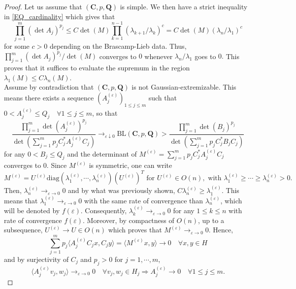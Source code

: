 \documentclass[11pt,a4paper,reqno]{amsart}
\numberwithin{equation}{section}
\theoremstyle{definition}
\newcommand{\<}{\ensuremath \leq}
\renewcommand{\>}{\ensuremath \geq}
\renewcommand{\epsilon}{\varepsilon}
\begin{document}
\begin{proof}
    
    Let us assume that $(\textbf{C},p,\textbf{Q})$ is simple. We then have a strict inequality in \cref{EQ_cardinality} which gives that $$\prod_{j=1}^m (\det A_j)^{p_j} \leq C \det(M) \prod_{k=1}^{n-1}(\lambda_{k+1}/\lambda_k)^c=C \det(M) (\lambda_n /\lambda_1)^c$$ for some $c>0$ depending on the Brascamp-Lieb data. Thus, $\prod_{j=1}^m (\det A_j)^{p_j}/\det(M)$ converges to $0$ whenever $\lambda_n/\lambda_1$ goes to $0.$ This proves that it suffices to evaluate the supremum in the region $\lambda_1(M) \leq C\lambda_n(M).$ \\ Assume by contradiction that $(\textbf{C},p,\textbf{Q})$ is not Gaussian-extremizable. This means there exists a sequence $(A_j^{(\epsilon)})_{1 \leq j \leq m}$ such that $0<A_j^{(\epsilon)} \leq Q_j \quad \forall 1 \leq j \leq m$, so that $$\frac{\prod_{j=1}^m \det(A_j^{(\epsilon)})^{p_j}}{\det(\sum_{j=1}^m p_jC_j^*A_j^{(\epsilon)}C_j)} \rightarrow_{\epsilon \downarrow 0} \mathrm{BL}(\textbf{C},p,\textbf{Q})>\frac{\prod_{j=1}^m \det(B_j)^{p_j}}{\det(\sum_{j=1}^m p_jC_j^*B_jC_j)}$$ for any $0<B_j \leq Q_j$ and the determinant of $M^{(\epsilon)}=\sum_{j=1}^m p_jC_j^* A_j^{(\epsilon)}C_j$  converges to $0.$ Since $M^{(\epsilon)}$ is symmetric, one can write $$M^{(\epsilon)}=U^{(\epsilon)}\mathrm{diag}(\lambda_1^{(\epsilon)},\cdots,\lambda_n^{(\epsilon)})(U^{(\epsilon)})^T \text{ for } U^{(\epsilon)} \in O(n), \text{ with } \lambda_1^{(\epsilon)} \geq \cdots \geq \lambda_n^{(\epsilon)}>0.$$ Then, $\lambda_n^{(\epsilon)} \rightarrow_{\epsilon \rightarrow 0} 0$ and by what was previously shown, $C\lambda_n^{(\epsilon)} \geq \lambda_1^{(\epsilon)}$. This means that $\lambda_1^{(\epsilon)} \rightarrow_{\epsilon \rightarrow 0} 0$ with the same rate of convergence than $\lambda_n^{(\epsilon)}$, which will be denoted by $f(\epsilon).$ Consequently, $\lambda_k^{(\epsilon)} \rightarrow_{\epsilon \rightarrow 0} 0$ for any $1 \leq k \leq n$ with rate of convergence $f(\epsilon).$   
    Moreover, by compactness of $O(n)$, up to a subsequence, $U^{(\epsilon)} \rightarrow U \in O(n)$ which proves that $M^{(\epsilon)} \rightarrow_{\epsilon \rightarrow 0} 0.$ Hence, $$\sum_{j=1}^m p_j\langle A_j^{(\epsilon)}C_jx,C_jy\rangle=\langle M^{(\epsilon)}x,y\rangle \rightarrow 0 \quad \forall x,y \in H$$ and by surjectivity of $C_j$ and $p_j>0$ for $j=1,\cdots,m$, $$\langle A_j^{(\epsilon)}v_j,w_j \rangle \rightarrow_{\epsilon \rightarrow 0} 0 \quad \forall v_j, w_j \in H_j \Longrightarrow A_j^{(\epsilon)} \rightarrow 0 \quad \forall 1 \leq j \leq m.$$ 

\end{proof}
\end{document}
